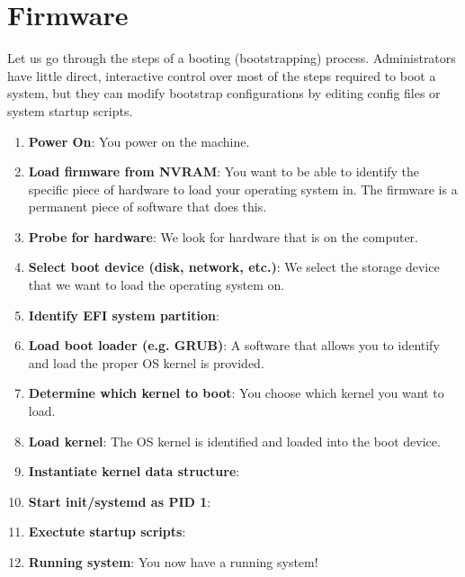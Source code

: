 \documentclass{article}
\theoremstyle{definition}
\begin{document}
\section{Firmware} 

  Let us go through the steps of a booting (bootstrapping) process. Administrators have little direct, interactive control over most of the steps required to boot a system, but they can modify bootstrap configurations by editing config files or system startup scripts. 

  \begin{enumerate}
    \item \textbf{Power On}: You power on the machine. 
    \item \textbf{Load firmware from NVRAM}: You want to be able to identify the specific piece of hardware to load your operating system in. The firmware is a permanent piece of software that does this. 
    \item \textbf{Probe for hardware}: We look for hardware that is on the computer. 
    \item \textbf{Select boot device (disk, network, etc.)}: We select the storage device that we want to load the operating system on. 
    \item \textbf{Identify EFI system partition}: 
    \item \textbf{Load boot loader (e.g. GRUB)}: A software that allows you to identify and load the proper OS kernel is provided. 
    \item \textbf{Determine which kernel to boot}: You choose which kernel you want to load.  
    \item \textbf{Load kernel}: The OS kernel is identified and loaded into the boot device. 
    \item \textbf{Instantiate kernel data structure}: 
    \item \textbf{Start init/systemd as PID 1}: 
    \item \textbf{Exectute startup scripts}:
    \item \textbf{Running system}: You now have a running system! 
  \end{enumerate}
\end{document}
